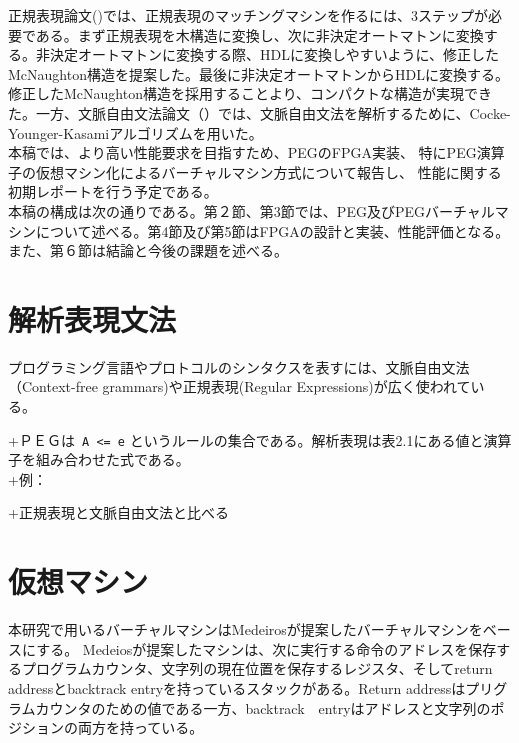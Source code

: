 \documentclass[paper]{ieicej}
\begin{document}
正規表現論文()では、正規表現のマッチングマシンを作るには、3ステップが必要である。まず正規表現を木構造に変換し、次に非決定オートマトンに変換する。非決定オートマトンに変換する際、HDLに変換しやすいように、修正したMcNaughton構造を提案した。最後に非決定オートマトンからHDLに変換する。修正したMcNaughton構造を採用することより、コンパクトな構造が実現できた。一方、文脈自由文法論文（）では、文脈自由文法を解析するために、Cocke-Younger-Kasamiアルゴリズムを用いた。\\

本稿では、より高い性能要求を目指すため、PEGのFPGA実装、
特にPEG演算子の仮想マシン化によるバーチャルマシン方式について報告し、
性能に関する初期レポートを行う予定である。\\


本稿の構成は次の通りである。第２節、第3節では、PEG及びPEGバーチャルマシンについて述べる。第4節及び第5節はFPGAの設計と実装、性能評価となる。また、第６節は結論と今後の課題を述べる。\\


\section{解析表現文法}

プログラミング言語やプロトコルのシンタクスを表すには、文脈自由文法（Context-free grammars)や正規表現(Regular Expressions)が広く使われている。

+ＰＥＧは\texttt{ A <= e} というルールの集合である。解析表現は表2.1にある値と演算子を組み合わせた式である。\\

+例：

+正規表現と文脈自由文法と比べる




\section{仮想マシン}

本研究で用いるバーチャルマシンはMedeirosが提案したバーチャルマシンをベースにする。
Medeiosが提案したマシンは、次に実行する命令のアドレスを保存するプログラムカウンタ、文字列の現在位置を保存するレジスタ、そしてreturn addressとbacktrack entryを持っているスタックがある。Return addressはプリグラムカウンタのための値である一方、backtrack　entryはアドレスと文字列のポジションの両方を持っている。
\end{document}
